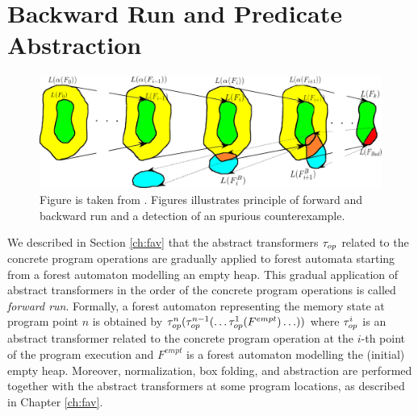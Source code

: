 \section{Backward Run and Predicate Abstraction}
\label{sec:br}

\begin{figure}[t]
	\centering
	\includegraphics[scale=0.35]{fig/artmc.png}
	\caption{
		Figure is taken from \cite{artmc}.
		Figures illustrates principle of forward and backward run and
		a detection of an spurious counterexample.}
	\label{fig:bwrun}
\end{figure}

We described in Section \ref{ch:fav} that the abstract transformers $\tau_{op}$
related to the concrete program operations are gradually applied to forest automata
starting from a forest automaton modelling an empty heap.
This gradual application of abstract transformers in the order of
the concrete program operations is called \emph{forward run}.
Formally, a forest automaton representing the memory state 
at program point $n$ is obtained by
$\tau_{op}^n(\tau_{op}^{n-1}(\ldots \tau_{op}^{1}(F^{empt}) \ldots))$
where $\tau_{op}^i$ is an abstract transformer related to the concrete
program operation at the $i$-th point of the program execution and
$F^{empt}$ is a forest automaton modelling the (initial) empty heap.
Moreover, normalization, box folding, and abstraction are performed
together with the abstract transformers at some program locations,
as described in Chapter \ref{ch:fav}.

